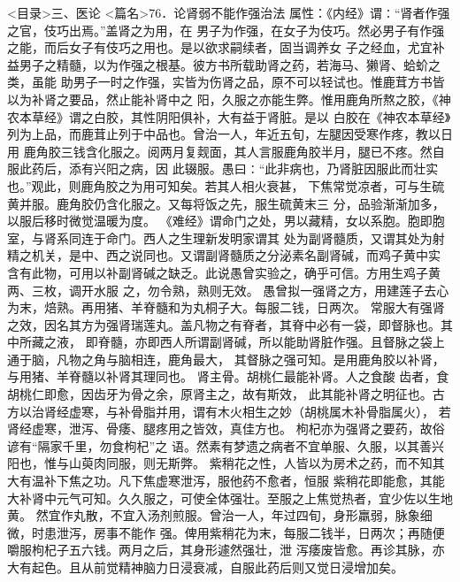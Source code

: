 \documentclass[a4paper,12pt,UTF8,twoside]{ctexbook}
\begin{document}
<目录>三、医论
<篇名>76．论肾弱不能作强治法
属性：《内经》谓∶“肾者作强之官，伎巧出焉。”盖肾之为用，在 
男子为作强，在女子为伎巧。然必男子有作强之能，而后女子有伎巧之用也。是以欲求嗣续者，固当调养女 
子之经血，尤宜补益男子之精髓，以为作强之根基。彼方书所载助肾之药，若海马、獭肾、蛤蚧之类，虽能 
助男子一时之作强，实皆为伤肾之品，原不可以轻试也。惟鹿茸方书皆以为补肾之要品，然止能补肾中之 
阳，久服之亦能生弊。惟用鹿角所熬之胶，《神农本草经》谓之白胶，其性阴阳俱补，大有益于肾脏。是以 
白胶在《神农本草经》列为上品，而鹿茸止列于中品也。曾治一人，年近五旬，左腿因受寒作疼，教以日用 
鹿角胶三钱含化服之。阅两月复觌面，其人言服鹿角胶半月，腿已不疼。然自服此药后，添有兴阳之病，因 
此辍服。愚曰∶“此非病也，乃肾脏因服此而壮实也。”观此，则鹿角胶之为用可知矣。若其人相火衰甚， 
下焦常觉凉者，可与生硫黄并服。鹿角胶仍含化服之。又每将饭之先，服生硫黄末三 
分，品验渐渐加多，以服后移时微觉温暖为度。 
《难经》谓命门之处，男以藏精，女以系胞。胞即胞室，与肾系同连于命门。西人之生理新发明家谓其 
处为副肾髓质，又谓其处为射精之机关，是中、西之说同也。又谓副肾髓质之分泌素名副肾碱，而鸡子黄中实 
含有此物，可用以补副肾碱之缺乏。此说愚曾实验之，确乎可信。方用生鸡子黄两、三枚，调开水服 
之，勿令熟，熟则无效。 
愚曾拟一强肾之方，用建莲子去心为末，焙熟。再用猪、羊脊髓和为丸桐子大。每服二钱，日两次。 
常服大有强肾之效，因名其方为强肾瑞莲丸。盖凡物之有脊者，其脊中必有一袋，即督脉也。其中所藏之液， 
即脊髓，亦即西人所谓副肾碱，所以能助肾脏作强。且督脉之袋上通于脑，凡物之角与脑相连，鹿角最大， 
其督脉之强可知。是用鹿角胶以补肾，与用猪、羊脊髓以补肾其理同也。 
肾主骨。胡桃仁最能补肾。人之食酸 齿者，食胡桃仁即愈，因齿牙为骨之余，原肾主之，故有斯效， 
此其能补肾之明征也。古方以治肾经虚寒，与补骨脂并用，谓有木火相生之妙（胡桃属木补骨脂属火）， 
若肾经虚寒，泄泻、骨痿、腿疼用之皆效，真佳方也。 
枸杞亦为强肾之要药，故俗谚有“隔家千里，勿食枸杞”之 
语。然素有梦遗之病者不宜单服、久服，以其善兴阳也，惟与山萸肉同服，则无斯弊。 
紫稍花之性，人皆以为房术之药，而不知其大有温补下焦之功。凡下焦虚寒泄泻，服他药不愈者，恒服 
紫稍花即能愈，其能大补肾中元气可知。久久服之，可使全体强壮。至服之上焦觉热者，宜少佐以生地黄。 
然宜作丸散，不宜入汤剂煎服。曾治一人，年过四旬，身形羸弱，脉象细微，时患泄泻，房事不能作 
强。俾用紫稍花为末，每服二钱半，日两次；再随便嚼服枸杞子五六钱。两月之后，其身形遽然强壮，泄 
泻痿废皆愈。再诊其脉，亦大有起色。且从前觉精神脑力日浸衰减，自服此药后则又觉日浸增加矣。 
\end{document}
